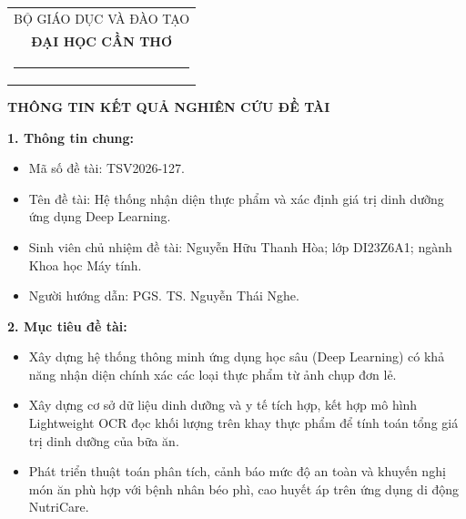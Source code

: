 \clearpage %
{}

\noindent
\begin{tabular}{@{}c@{}}
    \fontsize{12pt}{15pt}\selectfont BỘ GIÁO DỤC VÀ ĐÀO TẠO \\
    \fontsize{12pt}{15pt}\selectfont \textbf{ĐẠI HỌC CẦN THƠ} \\[-20pt] %
    \rule{3.2cm}{0.6pt}
\end{tabular}
\vspace{0.8cm}

\begin{center}
    {\fontsize{14pt}{18pt}\selectfont\bfseries THÔNG TIN KẾT QUẢ NGHIÊN CỨU ĐỀ TÀI\par}
\end{center}

\vspace{0.5cm}

\noindent\textbf{1. Thông tin chung:}
\begin{itemize}[leftmargin=0.8cm, label=\textbullet, itemsep=2pt, topsep=2pt]
    \item Mã số đề tài: TSV2026-127.
    \item Tên đề tài: Hệ thống nhận diện thực phẩm và xác định giá trị dinh dưỡng ứng dụng Deep Learning.
    \item Sinh viên chủ nhiệm đề tài: Nguyễn Hữu Thanh Hòa; lớp DI23Z6A1; ngành Khoa học Máy tính.
    \item Người hướng dẫn: PGS. TS. Nguyễn Thái Nghe.
\end{itemize}

\vspace{0.3cm}
\noindent\textbf{2. Mục tiêu đề tài:}
\begin{itemize}[leftmargin=0.8cm, label=\textbullet, itemsep=2pt, topsep=2pt]
    \item Xây dựng hệ thống thông minh ứng dụng học sâu (Deep Learning) có khả năng nhận diện chính xác các loại thực phẩm từ ảnh chụp đơn lẻ.
    \item Xây dựng cơ sở dữ liệu dinh dưỡng và y tế tích hợp, kết hợp mô hình Lightweight OCR đọc khối lượng trên khay thực phẩm để tính toán tổng giá trị dinh dưỡng của bữa ăn.
    \item Phát triển thuật toán phân tích, cảnh báo mức độ an toàn và khuyến nghị món ăn phù hợp với bệnh nhân béo phì, cao huyết áp trên ứng dụng di động NutriCare.
\end{itemize}

